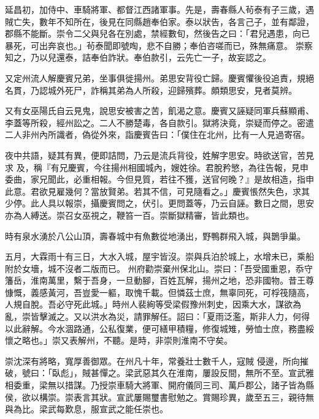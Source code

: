 \begin{pinyinscope}
 延昌初，加侍中、車騎將軍、都督江西諸軍事。先是，壽春縣人茍泰有子三歲，遇賊亡失，數年不知所在，後見在同縣趙奉伯家。泰以狀告，各言己子，並有鄰證，郡縣不能斷。崇令二父與兒各在別處，禁經數旬，然後告之曰：「君兒遇患，向已暴死，可出奔哀也。」茍泰聞即號啕，悲不自勝；奉伯咨嗟而已，殊無痛意。
 崇察知之，乃以兒還泰，詰奉伯詐狀。奉伯款引，云先亡一子，故妄認之。



 又定州流人解慶賓兄弟，坐事俱徙揚州。弟思安背役亡歸。慶賓懼後役追責，規絕名貫，乃認城外死尸，詐稱其弟為人所殺，迎歸殯葬。頗類思安，見者莫辨。



 又有女巫陽氏自云見鬼，說思安被害之苦，飢渴之意。慶賓又誣疑同軍兵蘇顯甫、李蓋等所殺，經州訟之。二人不勝楚毒，各自款引。獄將決竟，崇疑而停之。密遣二人非州內所識者，偽從外來，詣慶賓告曰：「僕住在北州，比有一人見過寄宿。



 夜中共語，疑其有異，便即詰問，乃云是流兵背役，姓解字思安。時欲送官，苦見求
 及，稱『有兄慶賓，今往揚州相國城內，嫂姓徐。君脫矜慜，為往告報，見申委曲，家兄聞此，必重相報。今但見質，若往不獲，送官何晚？』是故相造，指申此意。君欲見雇幾何？當放賢弟。若其不信，可見隨看之。」慶賓悵然失色，求其少停。此人具以報崇，攝慶賓問之，伏引。更問蓋等，乃云自誣。數日之間，思安亦為人縛送。崇召女巫視之，鞭笞一百。崇斷獄精審，皆此類也。



 時有泉水湧於八公山頂，壽春城中有魚數從地湧出，野鴨群飛入城，與鵲爭巢。



 五月，大霖雨十有三日，大水入城，屋宇皆沒。崇與兵泊於城上，水增未已，乘船附於女墻，城不沒者二版而已。
 州府勸崇棄州保北山。崇曰：「吾受國重恩，忝守籓岳，淮南萬里，繫于吾身，一旦動腳，百姓瓦解，揚州之地，恐非國物。昔王尊慷慨，義感黃河，吾豈愛一軀，取愧千載。但憐茲士庶，無辜同死，可桴筏隨高，人規自脫。吾必守死此城。」時州人裴絢等受梁假豫州刺史，因乘大水，謀欲為亂，崇皆擊滅之。又以洪水為災，請罪解任。詔曰：「夏雨泛濫，斯非人力，何得以此辭解。今水涸路通，公私復業，便可繕甲積糧，修復城雉，勞恤士庶，務盡綏懷之略也。」崇又表解州，不聽。是時，非崇則淮南不守矣。



 崇沈深有將略，寬厚善御眾。在州凡十年，常養壯士數千人，寇賊
 侵邊，所向摧破，號曰：「臥彪」，賊甚憚之。梁武惡其久在淮南，屢設反間，無所不至。宣武雅相委重，梁無以措謀。乃授崇車騎大將軍、開府儀同三司、萬戶郡公，諸子皆為縣侯，欲以構崇。崇表言其狀。宣武屢賜璽書慰勉之。賞賜珍異，歲至五三，親待無與為比。梁武每歎息，服宣武之能任崇也。




\end{pinyinscope}

